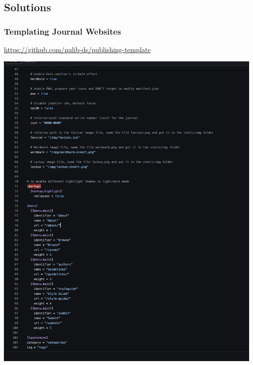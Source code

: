 \documentclass[aspectratio=169,9pt,xcolor=dvipsnames]{beamer}
\begin{document}
\subsection{Solutions}
\begin{frame}
    \frametitle{Templating Journal Websites}
    \begin{center}
    \url{https://github.com/nulib-ds/publishing-template}
    \begin{center}
        \includegraphics[width=\textwidth, height=\textheight, keepaspectratio]{config.png}
    \end{center}
    \end{center}
\end{frame}
\end{document}
